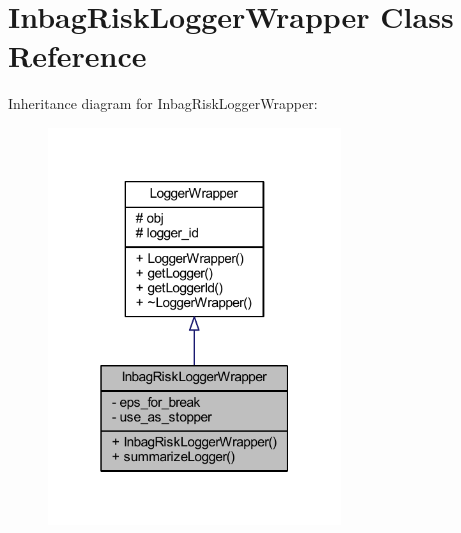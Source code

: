 \hypertarget{class_inbag_risk_logger_wrapper}{}\section{Inbag\+Risk\+Logger\+Wrapper Class Reference}
\label{class_inbag_risk_logger_wrapper}


Inheritance diagram for Inbag\+Risk\+Logger\+Wrapper\+:\nopagebreak
\begin{figure}[H]
\begin{center}
\leavevmode
\includegraphics[width=220pt]{class_inbag_risk_logger_wrapper__inherit__graph}
\end{center}
\end{figure}


